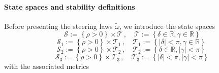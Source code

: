 \documentclass[letterpaper, 10 pt, conference]{ieeeconf}  %
\newcommand{\abs}[1]{\left\lvert#1\right\rvert}
\begin{document}
\paragraph{State spaces and stability definitions}
Before presenting the steering laws $\tilde{\omega}$, we introduce the state spaces 
\begin{equation}
\mathcal{S} := 
\left\{ \rho> 0\right\}\times\mathcal{T}\,,\quad \mathcal{T}:= \left\{ \delta \in\mathbb{R}, \gamma \in\mathbb{R}  \right\} 
\label{eq:ss_S}
\end{equation}
\begin{equation}
    \mathcal{S}_1 := \left\{ \rho> 0\right\}\times\mathcal{T}_1\,,\quad \mathcal{T}_1:= \left\{  \abs{\delta} <  \pi, \gamma \in\mathbb{R} \right\} \  \label{eq:ss_S1}
\end{equation}
\begin{equation}
   \mathcal{S}_2 := \left\{ \rho> 0\right\}\times\mathcal{T}_2\,,\quad \mathcal{T}_2:= \left\{ \delta \in\mathbb{R}, \abs{\gamma} < \pi \right\}\  \label{eq:ss_S2} 
\end{equation}
\begin{equation}
    \mathcal{S}_3 := \left\{ \rho> 0\right\}\times\mathcal{T}_3\,,\quad \mathcal{T}_3:= \left\{ \abs{\delta} < \pi, \abs{\gamma} < \pi\right\} \label{eq:ss_S3}
\end{equation}
 with the associated metrics
\end{document}
